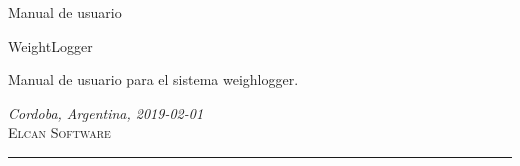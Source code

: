 \documentclass[a4paper,spanish]{article}
\author{%
	Mario O. Villarroel \\
	System Design/Developer\\
	\texttt{movilla@elcansoftware.com}\vspace{20pt} \\
	Pablo Giachero\\
	Product Owner\\
	\texttt{pgiachero@elcansoftware.com}
}
\def\documentdate{Cordoba, Argentina, 2019-02-01}
\begin{document}
	\begin{titlepage}
		\noindent
		\titlepagedecoration
		\titlefont Manual de usuario\par
		\vspace*{15pt}
		\subtitlefont WeightLogger\par
		\epigraph{Manual de usuario para el sistema weighlogger.}%
		{\textit{\documentdate}\\ \textsc{Elcan Software}}
		\null\vfill
		\vspace*{1cm}
		\noindent
		\hfill
		\begin{minipage}{0.50\linewidth}
		    \begin{flushright}
		        \printauthor
		    \end{flushright}
		\end{minipage}
		\begin{minipage}{0.02\linewidth}
		    \rule{1pt}{125pt}
		\end{minipage}
	\end{titlepage}
	\tableofcontents
	
	
\end{document}
